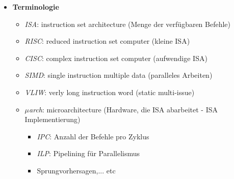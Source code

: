\begin{itemize}
        \item \textbf{Terminologie}
            \begin{itemize}
                \item \textit{ISA}: instruction set architecture (Menge der verfügbaren Befehle)
                \item \textit{RISC}: reduced instruction set computer (kleine ISA)
                \item \textit{CISC}: complex instruction set computer (aufwendige ISA)
                \item \textit{SIMD}: single instruction multiple data (paralleles Arbeiten)
                \item \textit{VLIW}: verly long instruction word (static multi-issue)
                \item \textit{$\mu$arch}: microarchitecture (Hardware, die ISA abarbeitet - ISA Implementierung)
                    \begin{itemize}
                        \item \textit{IPC}: Anzahl der Befehle pro Zyklus
                        \item \textit{ILP}: Pipelining für Parallelismus
                        \item Sprungvorhersagen,... etc
                    \end{itemize}
            \end{itemize}
    \end{itemize}

